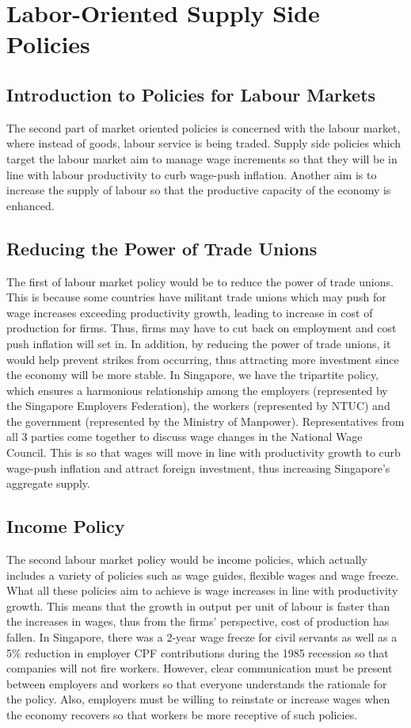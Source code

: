 \section{Labor-Oriented Supply Side Policies}
\subsection{Introduction to Policies for Labour Markets}
The second part of market oriented policies is concerned with the labour market, where instead of goods, labour service is being traded. Supply side policies which target the labour market aim to manage wage increments so that they will be in line with labour productivity to curb wage-push inflation. Another aim is to increase the supply of labour so that the productive capacity of the economy is enhanced.
\subsection{Reducing the Power of Trade Unions}
The first of labour market policy would be to reduce the power of trade unions. This is because some countries have militant trade unions which may push for wage increases exceeding productivity growth, leading to increase in cost of production for firms. Thus, firms may have to cut back on employment and cost push inflation will set in. In addition, by reducing the power of trade unions, it would help prevent strikes from occurring, thus attracting more investment since the economy will be more stable. In Singapore, we have the tripartite policy, which ensures a harmonious relationship among the employers (represented by the Singapore Employers Federation), the workers (represented by NTUC) and the government (represented by the Ministry of Manpower). Representatives from all 3 parties come together to discuss wage changes in the National Wage Council. This is so that wages will move in line with productivity growth to curb wage-push inflation and attract foreign investment, thus increasing Singapore's aggregate supply.
\subsection{Income Policy}
The second labour market policy would be income policies, which actually includes a variety of policies such as wage guides, flexible wages and wage freeze. What all these policies aim to achieve is wage increases in line with productivity growth. This means that the growth in output per unit of labour is faster than the increases in wages, thus from the firms' perspective, cost of production has fallen. In Singapore, there was a 2-year wage freeze for civil servants as well as a 5\% reduction in employer CPF contributions during the 1985 recession so that companies will not fire workers. However, clear communication must be present between employers and workers so that everyone understands the rationale for the policy. Also, employers must be willing to reinstate or increase wages when the economy recovers so that workers be more receptive of such policies.
